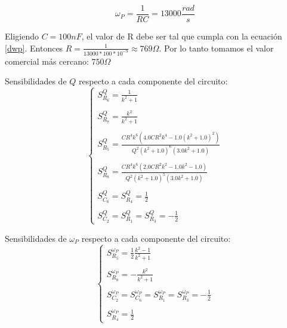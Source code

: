 \begin{equation}
	\omega_P = \frac{1}{RC} = 13000\frac{rad}{s}
	\label{dwp}
\end{equation}

Eligiendo $C = 100nF$, el valor de R debe ser tal que cumpla con la ecuaci\'on \ref{dwp}. Entonces $R = \frac{1}{13000 * 100 *10^{-9}} \approx 769\Omega.$ Por lo tanto tomamos el valor comercial m\'as cercano: $750\Omega$


Sensibilidades de $Q$ respecto a cada componente del circuito:
\begin{equation}
\begin{cases}
S^{Q}_{R_6} = \frac{1}{k^{2} + 1}\\ \\
S^{Q}_{R_7} = \frac{k^{2}}{k^{2} + 1}\\ \\
S^{Q}_{R_5} =\frac{C R^{4} k^{6} \left(4.0 C R^{2} k^{4} - 1.0 \left(k^{2} + 1.0\right)^{2}\right)}{Q^{2} \left(k^{2} + 1.0\right)^{6} \left(3.0 k^{2} + 1.0\right)}
 \\ \\
S^{Q}_{R_8} = \frac{C R^{4} k^{6} \left(2.0 C R^{2} k^{2} - 1.0 k^{2} - 1.0\right)}{Q^{2} \left(k^{2} + 1.0\right)^{5} \left(3.0 k^{2} + 1.0\right)}
\\ \\
S^{Q}_{C_6} = S^{Q}_{R_4} =\frac{1}{2} \\ \\
S^{Q}_{C_2} = S^{Q}_{R_1} = S^{Q}_{R_3} =-\frac{1}{2}
\end{cases}
\end{equation}

Sensibilidades de $\omega_P$ respecto a cada componente del circuito:
\begin{equation}
\begin{cases}
S^{\omega_P}_{R_5} = \frac{1}{2} \frac{k^{2} - 1}{k^{2} + 1} \\ \\
S^{\omega_P}_{R_8} = - \frac{k^{2}}{k^{2} + 1}\\ \\
S^{\omega_P}_{C_2} = S^{\omega_P}_{C_6}= S^{\omega_P}_{R_1}=S^{\omega_P}_{R_3}=	-  \frac{1}{2}\\ \\
S^{\omega_P}_{R_4} = \frac{1}{2}
\end{cases}
\end{equation}
